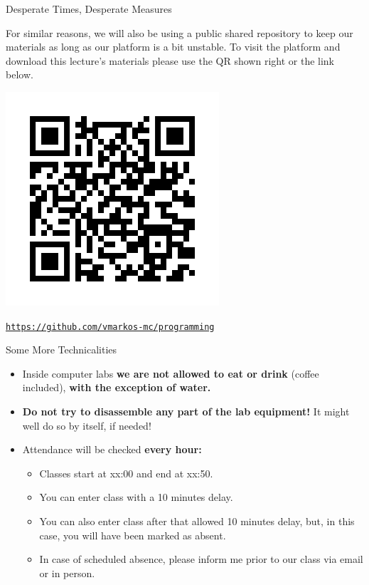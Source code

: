 \documentclass[aspectratio=169, 12pt, xcolor=table]{beamer}
\newcommand{\ohref}[1]{\href{#1}{\texttt{#1}}}
\begin{document}
	\begin{headsup}{Desperate Times, Desperate Measures}
		\begin{minipage}[t]{0.50\textwidth}
			\vspace{0pt}
			For similar reasons, we will also be using a public shared repository to keep our materials as long as our platform is a bit unstable. To visit the platform and download this lecture's materials please use the QR shown right or the link below.
		\end{minipage}\hfill
		\begin{minipage}[t]{0.48\textwidth}
			\vspace{0pt}
			\raggedleft
			\includegraphics[scale=0.45]{./assets/shared_folder.png}
			\centering
		\end{minipage}
		\vfill
		\begin{scriptsize}
			\ohref{https://github.com/vmarkos-mc/programming}
		\end{scriptsize}
	\end{headsup}

	\begin{headsup}{Some More Technicalities}
		\begin{itemize}
			\item Inside computer labs \textbf{we are not allowed to eat or drink} (coffee included), \textbf{with the exception of water.}
			\item \textbf{Do not try to disassemble any part of the lab equipment!} It might well do so by itself, if needed!
			\item Attendance will be checked \textbf{every hour:}
			\begin{itemize}
				\item Classes start at xx:00 and end at xx:50.
				\item You can enter class with a 10 minutes delay.
				\item You can also enter class after that  allowed 10 minutes delay, but, in this case, you will have been marked as absent.
				\item In case of scheduled absence, please inform me prior to our class via email or in person.
			\end{itemize}
		\end{itemize}
	\end{headsup}
	
\end{document}
